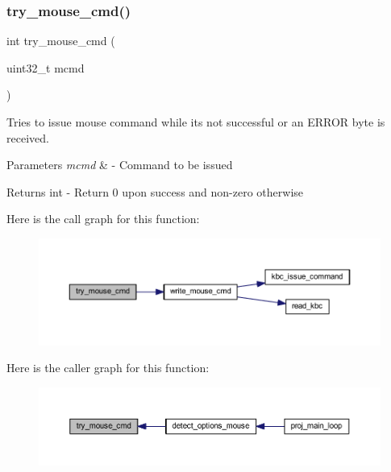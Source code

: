 \subsubsection{\texorpdfstring{try\+\_\+mouse\+\_\+cmd()}{try\_mouse\_cmd()}}
{\footnotesize\ttfamily int try\+\_\+mouse\+\_\+cmd (\begin{DoxyParamCaption}\item[{uint32\+\_\+t}]{mcmd }\end{DoxyParamCaption})}



Tries to issue mouse command while its not successful or an E\+R\+R\+OR byte is received. 


\begin{DoxyParams}{Parameters}
{\em mcmd} & -\/ Command to be issued \\
\hline
\end{DoxyParams}
\begin{DoxyReturn}{Returns}
int -\/ Return 0 upon success and non-\/zero otherwise 
\end{DoxyReturn}
Here is the call graph for this function\+:
\nopagebreak
\begin{figure}[H]
\begin{center}
\leavevmode
\includegraphics[width=350pt]{group__mouse_ga34f5d4446d7bc96bd4456ceab5d08ec9_cgraph}
\end{center}
\end{figure}
Here is the caller graph for this function\+:
\nopagebreak
\begin{figure}[H]
\begin{center}
\leavevmode
\includegraphics[width=350pt]{group__mouse_ga34f5d4446d7bc96bd4456ceab5d08ec9_icgraph}
\end{center}
\end{figure}
\mbox{\label{group__mouse_ga992ee1b8a073ba102ee34e483b25c380}} 
